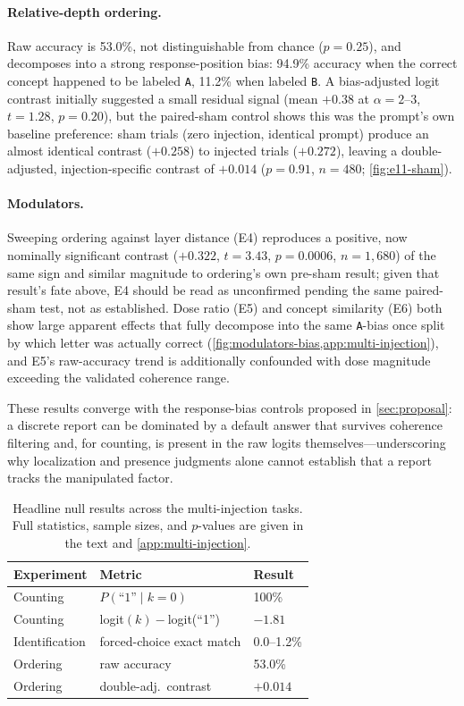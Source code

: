 \paragraph{Relative-depth ordering.}
Raw accuracy is 53.0\%, not distinguishable from chance ($p=0.25$), and decomposes into a strong response-position bias: 94.9\% accuracy when the correct concept happened to be labeled \texttt{A}, 11.2\% when labeled \texttt{B}.
A bias-adjusted logit contrast initially suggested a small residual signal (mean $+0.38$ at $\alpha{=}2\text{--}3$, $t=1.28$, $p=0.20$), but the paired-sham control shows this was the prompt's own baseline preference: sham trials (zero injection, identical prompt) produce an almost identical contrast ($+0.258$) to injected trials ($+0.272$), leaving a double-adjusted, injection-specific contrast of $+0.014$ ($p=0.91$, $n=480$; \cref{fig:e11-sham}).

\paragraph{Modulators.}
Sweeping ordering against layer distance (E4) reproduces a positive, now nominally significant contrast ($+0.322$, $t=3.43$, $p=0.0006$, $n=1{,}680$) of the same sign and similar magnitude to ordering's own pre-sham result; given that result's fate above, E4 should be read as unconfirmed pending the same paired-sham test, not as established.
Dose ratio (E5) and concept similarity (E6) both show large apparent effects that fully decompose into the same \texttt{A}-bias once split by which letter was actually correct (\cref{fig:modulators-bias,app:multi-injection}), and E5's raw-accuracy trend is additionally confounded with dose magnitude exceeding the validated coherence range.

These results converge with the response-bias controls proposed in \cref{sec:proposal}: a discrete report can be dominated by a default answer that survives coherence filtering and, for counting, is present in the raw logits themselves---underscoring why localization and presence judgments alone cannot establish that a report tracks the manipulated factor.

\begin{table}[H]
\centering
\small
\begin{tabular}{lll}
\toprule
Experiment & Metric & Result \\
\midrule
Counting & $P(\text{``1''}\mid k{=}0)$ & 100\% \\
Counting & logit$(k)-$logit(``1'') & $-1.81$ \\
Identification & forced-choice exact match & 0.0--1.2\% \\
Ordering & raw accuracy & 53.0\% \\
Ordering & double-adj.\ contrast & $+0.014$ \\
\bottomrule
\end{tabular}
\caption{Headline null results across the multi-injection tasks. Full statistics, sample sizes, and $p$-values are given in the text and \cref{app:multi-injection}.}
\label{tab:multi-injection-summary}
\end{table}

